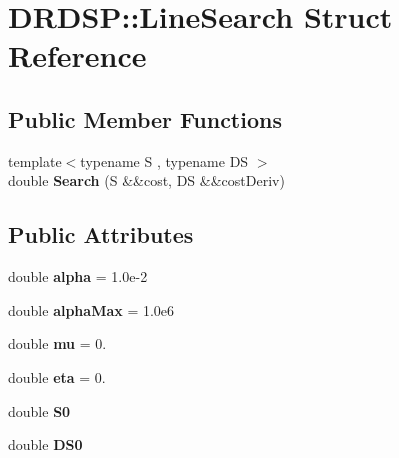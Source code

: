 \hypertarget{struct_d_r_d_s_p_1_1_line_search}{\section{D\-R\-D\-S\-P\-:\-:Line\-Search Struct Reference}
\label{struct_d_r_d_s_p_1_1_line_search}
}
\subsection*{Public Member Functions}
\begin{DoxyCompactItemize}
\item 
\hypertarget{struct_d_r_d_s_p_1_1_line_search_a6bcec01e58efcf7fe7306370de904717}{{\footnotesize template$<$typename S , typename D\-S $>$ }\\double {\bfseries Search} (S \&\&cost, D\-S \&\&cost\-Deriv)}\label{struct_d_r_d_s_p_1_1_line_search_a6bcec01e58efcf7fe7306370de904717}

\end{DoxyCompactItemize}
\subsection*{Public Attributes}
\begin{DoxyCompactItemize}
\item 
\hypertarget{struct_d_r_d_s_p_1_1_line_search_aa1b9be6dd476ea782296caf27fc87bcd}{double {\bfseries alpha} = 1.\-0e-\/2}\label{struct_d_r_d_s_p_1_1_line_search_aa1b9be6dd476ea782296caf27fc87bcd}

\item 
\hypertarget{struct_d_r_d_s_p_1_1_line_search_a79d6f5eaed56fd506b1d8a8f687d54a9}{double {\bfseries alpha\-Max} = 1.\-0e6}\label{struct_d_r_d_s_p_1_1_line_search_a79d6f5eaed56fd506b1d8a8f687d54a9}

\item 
\hypertarget{struct_d_r_d_s_p_1_1_line_search_a48ee96d436216a66de45a13d700fcdaa}{double {\bfseries mu} = 0.}\label{struct_d_r_d_s_p_1_1_line_search_a48ee96d436216a66de45a13d700fcdaa}

\item 
\hypertarget{struct_d_r_d_s_p_1_1_line_search_ad1e2b29ad51dd189d3631fad059ec5d9}{double {\bfseries eta} = 0.}\label{struct_d_r_d_s_p_1_1_line_search_ad1e2b29ad51dd189d3631fad059ec5d9}

\item 
\hypertarget{struct_d_r_d_s_p_1_1_line_search_a3bb00fed00ecf84072fc6af165be2776}{double {\bfseries S0}}\label{struct_d_r_d_s_p_1_1_line_search_a3bb00fed00ecf84072fc6af165be2776}

\item 
\hypertarget{struct_d_r_d_s_p_1_1_line_search_ad76f45369c080f3d44f1daaf96114fe2}{double {\bfseries D\-S0}}\label{struct_d_r_d_s_p_1_1_line_search_ad76f45369c080f3d44f1daaf96114fe2}

\end{DoxyCompactItemize}
